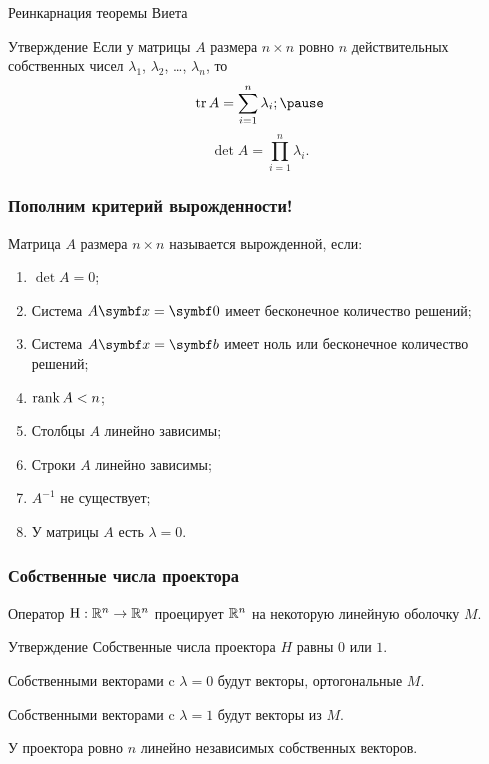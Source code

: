 \begin{frame}{Реинкарнация теоремы Виета}
\begin{block}{Утверждение}
    Если у матрицы $A$ размера $n\times n$ ровно $n$ действительных собственных чисел $\lambda_1$, 
    $\lambda_2$, \ldots, $\lambda_n$, то \pause
    \[
    \trace A = \sum_{i=1}^n \lambda_i; \pause
    \]
    \[
    \det A = \prod_{i=1}^n \lambda_i.   
    \]
\end{block}

\end{frame}

\begin{frame}
    \frametitle{Пополним критерий вырожденности!}

    Матрица $A$ размера $n\times n$ называется \alert{вырожденной}, если:

    \begin{enumerate}
        \item $\det A = 0$; 
        \item Система $A \bx = \bzero$ имеет бесконечное количество решений; 
        \item Система $A \bx = \bb$ имеет ноль или бесконечное количество решений; 
        \item $\rank A < n$; 
        \item Столбцы $A$ линейно зависимы; 
        \item Строки $A$ линейно зависимы; 
        \item $A^{-1}$ не существует; 
        \item \alert{У матрицы $A$ есть $\lambda=0$.}
    \end{enumerate}


\end{frame}



\begin{frame}
    \frametitle{Собственные числа проектора}

    Оператор $\mathrm{H}: \mathbb{R}^n \to \mathbb{R}^n$ проецирует $\mathbb{R}^n$ на некоторую линейную оболочку $M$. \pause
    
    \begin{block}{Утверждение}
        Собственные числа проектора $H$ равны $0$ или $1$. \pause
        
        Собственными векторами c $\lambda=0$ будут векторы, ортогональные $M$. \pause

        Собственными векторами c $\lambda=1$ будут векторы из  $M$. \pause

        У проектора ровно $n$ линейно независимых собственных векторов. 
    \end{block}

    

\end{frame}


